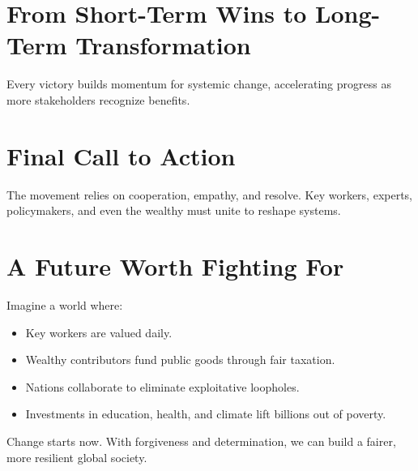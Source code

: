 \documentclass[11pt,a4paper]{article}
\begin{document}
\section{From Short-Term Wins to Long-Term Transformation}
Every victory builds momentum for systemic change, accelerating progress as more stakeholders recognize benefits.

\section{Final Call to Action}
The movement relies on cooperation, empathy, and resolve. Key workers, experts, policymakers, and even the wealthy must unite to reshape systems.

\section{A Future Worth Fighting For}
Imagine a world where:
\begin{itemize}
  \item Key workers are valued daily.
  \item Wealthy contributors fund public goods through fair taxation.
  \item Nations collaborate to eliminate exploitative loopholes.
  \item Investments in education, health, and climate lift billions out of poverty.
\end{itemize}

Change starts now. With forgiveness and determination, we can build a fairer, more resilient global society.
\end{document}
